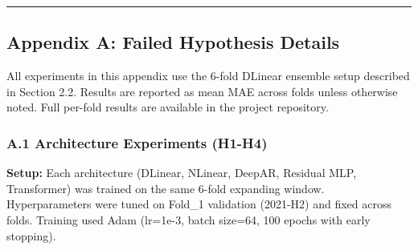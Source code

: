 \begin{center}\rule{0.5\linewidth}{0.5pt}\end{center}

\subsection{Appendix A: Failed Hypothesis
Details}\label{appendix-a-failed-hypothesis-details}

All experiments in this appendix use the 6-fold DLinear ensemble setup
described in Section 2.2. Results are reported as mean MAE across folds
unless otherwise noted. Full per-fold results are available in the
project repository.

\subsubsection{A.1 Architecture Experiments
(H1-H4)}\label{a.1-architecture-experiments-h1-h4}

\textbf{Setup:} Each architecture (DLinear, NLinear, DeepAR, Residual
MLP, Transformer) was trained on the same 6-fold expanding window.
Hyperparameters were tuned on Fold\_1 validation (2021-H2) and fixed
across folds. Training used Adam (lr=1e-3, batch size=64, 100 epochs
with early stopping).

